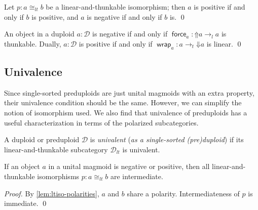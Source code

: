 \documentclass[runningheads]{llncs}
\newcommand*\rocqlogo{\usebox{\rocqlogobox}}
\newcommand{\lemmaref}[3]{\href{https://github.com/UniMath/UniMath/blob/94fae0eda57a778cec704bfa73b4ff525c9bc475/#1\#L#2?name=#3}{\rocqlogo}}
\newcommand{\acat}[1]{\mathcal{#1}}
\newcommand{\D}{\acat{D}}
\newcommand{\Cl}[1]{#1_l}
\newcommand{\Ct}[1]{#1_t}
\newcommand{\Clt}[1]{#1_{lt}}
\newcommand{\force}{\mathop{\mathsf{force}}\nolimits}
\newcommand{\wrap}{\mathop{\mathsf{wrap}}\nolimits}
\newcommand{\upshift}{\mathord{\Uparrow}}
\newcommand{\downshift}{\mathord{\Downarrow}}
\begin{document}
\begin{theorem}[{\lemmaref{UniMath/CategoryTheory/Nonassociative/UnitalMagmoids/PolarizedSubcategories.v}{750}{is\_negative\_of\_lt\_iso}}]
\label{lem:ltiso-polarities}
Let \(p : a \Clt\cong b\) be a linear\hyp{}and\hyp{}thunkable isomorphism; then
\(a\) is positive if and only if \(b\) is positive, and \(a\) is
negative if and only if \(b\) is.
\qed
\end{theorem}

\begin{corollary}[{\lemmaref{UniMath/CategoryTheory/Nonassociative/Duploids/Core.v}{745}{lt\_iso\_upshift\_of\_negative}}]
\label{lem:positive-and-negative-chars}
An object in a duploid \(a : \D\) is negative if and only if
\(\force_a \colon \upshift{a} \Cl\to a\) is thunkable. Dually, \(a : \D\)
is positive if and only if \(\wrap_a \colon a \Ct\to \downshift{a}\) is linear.
\qed
\end{corollary}
\subsection{Univalence}
\label{sec:dupl-univalence}
Since single\hyp{}sorted preduploids are just unital magmoids with an extra
property, their univalence condition should be the same. However, we
can simplify the notion of isomorphism used. We also find that
univalence of preduploids has a useful characterization in terms of
the polarized subcategories.

\begin{definition}[{\lemmaref{UniMath/CategoryTheory/Nonassociative/Duploids/Univalence.v}{57}{is\_dupl\_univalent}}]
\label{def:duploid-univalence}
A duploid or preduploid \(\D\) is \emph{univalent} (\emph{as a single\hyp{}sorted
(pre)duploid}) if its linear\hyp{}and\hyp{}thunkable subcategory \(\Clt\D\) is
univalent.
\end{definition}

\begin{theorem}[{\lemmaref{UniMath/CategoryTheory/Nonassociative/UnitalMagmoids/PolarizedSubcategories.v}{773}{lt\_iso\_is\_intermediate\_from\_polarized}}]
\label{lem:lt-iso-i-polarized}
If an object \(a\) in a unital magmoid is negative or positive, then
all linear\hyp{}and\hyp{}thunkable isomorphisms \(p : a \Clt\cong b\) are
intermediate.
\end{theorem}
\begin{proof}
By \autoref{lem:ltiso-polarities}, \(a\) and \(b\) share a polarity.
Intermediateness of \(p\) is immediate.
\qed
\end{proof}
\end{document}
